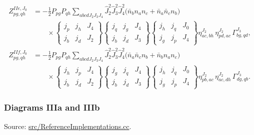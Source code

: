 \documentclass[
]{article}
\begin{document}
\begin{equation}
\begin{aligned}
Z^{IIe,J_0}_{pg,qh}
&=-\frac{1}{2}P_{pg}P_{qh}\sum_{abcdJ_2J_3J_4}
\hat J_2^2\hat J_3^2\hat J_4^2
\Big(\bar n_b n_a n_c+\bar n_a\bar n_c n_b\Big) \\
&\qquad\times
\begin{Bmatrix} j_p&j_h&J_4\\ j_b&j_d&J_2\end{Bmatrix}
\begin{Bmatrix} j_q&j_g&J_4\\ j_b&j_d&J_3\end{Bmatrix}
\begin{Bmatrix} j_h&j_q&J_0\\ j_g&j_p&J_4\end{Bmatrix}
\eta^{J_2}_{ac,bh}\,
\eta^{J_2}_{pd,ac}\,
\Gamma^{J_3}_{bg,qd},\\
Z^{IIf,J_0}_{pg,qh}
&=-\frac{1}{2}P_{pg}P_{qh}\sum_{abcdJ_2J_3J_4}
\hat J_2^2\hat J_3^2\hat J_4^2
\Big(\bar n_a\bar n_c n_b+\bar n_b n_a n_c\Big) \\
&\qquad\times
\begin{Bmatrix} j_h&j_p&J_4\\ j_b&j_d&J_2\end{Bmatrix}
\begin{Bmatrix} j_g&j_q&J_4\\ j_b&j_d&J_3\end{Bmatrix}
\begin{Bmatrix} j_h&j_q&J_0\\ j_g&j_p&J_4\end{Bmatrix}
\eta^{J_2}_{pb,ac}\,
\eta^{J_2}_{ac,dh}\,
\Gamma^{J_3}_{dg,qb}.
\end{aligned}
\end{equation}

\subsubsection{Diagrams IIIa and IIIb}\label{diagrams-iiia-and-iiib}

Source:
\href{../src/ReferenceImplementations.cc\#L9066-L9551}{src/ReferenceImplementations.cc}.
\end{document}
